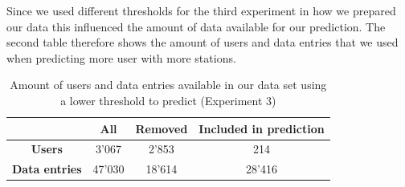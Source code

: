 Since we used different thresholds for the third experiment in how we prepared our data this influenced the amount of data available for our prediction. The second table therefore shows the amount of users and data entries that we used when predicting more user with more stations.

\begin{table}[H]	
	\begin{center}
		\begin{tabular}{c | c | c | c}
			& All & Removed & Included in prediction \\
			\hline
			\textbf{Users} & 3'067  & 2'853 & 214 \\
			\hline
			\textbf{Data entries} & 47'030 & 18'614 & 28'416 \\
		\end{tabular}
	\end{center}
	\caption{Amount of users and data entries available in our data set using a lower threshold to predict (Experiment 3)}
	\label{table:amount_of_higher_station_users}
\end{table}

